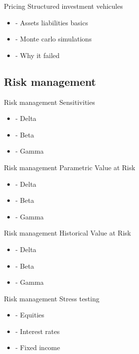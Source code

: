 \documentclass[8pt]{beamer}
\begin{document}
\begin{frame}{Pricing}
Structured investment vehicules
  \begin{itemize}
  \item
- Assets liabilities basics 
  \item
- Monte carlo simulations 
  \item
- Why it failed 
  \end{itemize}
\end{frame}

\subsection{Risk management}
\begin{frame}{Risk management}
Sensitivities
  \begin{itemize}
  \item
- Delta 
  \item
- Beta 
  \item
- Gamma 
  \end{itemize}
\end{frame}

\begin{frame}{Risk management}
Parametric Value at Risk
  \begin{itemize}
  \item
- Delta 
  \item
- Beta 
  \item
- Gamma 
  \end{itemize}
\end{frame}

\begin{frame}{Risk management}
Historical Value at Risk
  \begin{itemize}
  \item
- Delta 
  \item
- Beta 
  \item
- Gamma 
  \end{itemize}
\end{frame} 

\begin{frame}{Risk management}
Stress testing
  \begin{itemize}
  \item
- Equities 
  \item
- Interest rates 
  \item
- Fixed income 
  \end{itemize}
\end{frame} 
\end{document}
